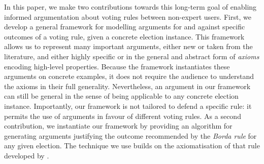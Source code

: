 \documentclass{comsoc2016}
\begin{document}
In this paper, we make two contributions towards this long-term goal of enabling informed argumentation about voting rules between non-expert users.
First, we develop a general framework for modelling arguments for and against specific outcomes of a voting rule, given a concrete election instance. This framework allows us to represent many important arguments, either new or taken from the literature, and either highly specific or in the general and abstract form of \emph{axioms} encoding high-level properties. Because the framework instantiates these arguments on concrete examples, it does not require the audience to understand the axioms in their full generality. Nevertheless, an argument in our framework can still be general in the sense of being applicable to any concrete election instance. Importantly, our framework is not tailored to defend a specific rule: it permits the use of arguments in favour of different voting rules. 
As a second contribution, we instantiate our framework by providing an algorithm for generating arguments justifying the outcome recommended by the \emph{Borda rule} for any given election. The technique we use builds on the axiomatisation of that rule developed by \citet{young_axiomatization_1974}.
\end{document}
